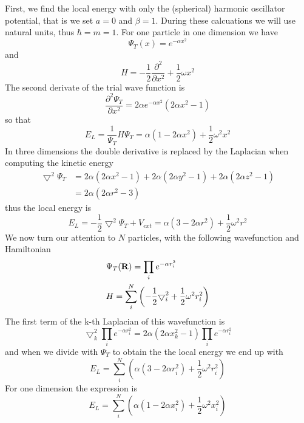 \documentclass[english, a4paper]{article}
\begin{document}
\noindent First, we find the local energy with only the (spherical) harmonic oscillator potential, that is we set $a=0$ and $\beta=1$.
During these calcuations we will use natural units, thus $\hbar=m=1$.
For one particle in one dimension we have
\begin{equation}
\Psi_T(x) = e^{-\alpha x^2}
\end{equation}
and
\begin{equation}
    H =  
	 -\frac{1}{2}
	 \frac{\partial^2}{\partial x^2} +
	 \frac{1}{2}\omega x^2
\end{equation}
The second derivate of the trial wave function is
\begin{equation}
 \frac{\partial^2 \Psi_T}{\partial x^2} = 2\alpha e^{-\alpha x^2}(2\alpha x^2 - 1)
\end{equation}
so that
\begin{equation}
 E_L = \frac{1}{\Psi_T}H\Psi_T = \alpha(1 - 2\alpha x^2) + \frac{1}{2}\omega^2x^2
\end{equation}
In three dimensions the double derivative is replaced by the Laplacian when computing the kinetic energy
\begin{align}
 \bigtriangledown^2\Psi_T &= 2\alpha(2\alpha x^2 - 1) + 2\alpha(2\alpha y^2 - 1) + 2\alpha(2\alpha z^2 - 1) \\
                          &= 2\alpha(2\alpha r^2 - 3)
\end{align}
thus the local energy is
\begin{equation}
 E_L = -\frac{1}{2}\bigtriangledown^2\Psi_T + V_{ext} = \alpha(3 - 2\alpha r^2) + \frac{1}{2}\omega^2r^2 
\end{equation}
We now turn our attention to $N$ particles, with the following wavefunction and Hamiltonian
\begin{align}
 &\Psi_T({\bf R}) = \prod_i e^{-\alpha r_i^2} \\
 &H =     \sum_i^N \left(
	 -\frac{1}{2}
	 { \bigtriangledown }_{i}^2 +
	 \frac{1}{2}\omega^2r_i^2 \right)
\end{align}
The first term of the k-th Laplacian of this wavefunction is
\begin{equation}
 \bigtriangledown^2_k\prod_i e^{-\alpha r_i^2} = 2\alpha(2\alpha x_k^2 - 1)\prod_i e^{-\alpha r_i^2}
\end{equation}
and when we divide with $\Psi_T$ to obtain the the local energy we end up with
\begin{equation}
 E_L = \sum_i^N \left( \alpha(3 - 2\alpha r_i^2) + \frac{1}{2}\omega^2r_i^2 \right)
\end{equation}
For one dimension the expression is
\begin{equation}
 E_L = \sum_i^N \left( \alpha(1 - 2\alpha x_i^2) + \frac{1}{2}\omega^2x_i^2 \right)
\end{equation}
\\
\end{document}
